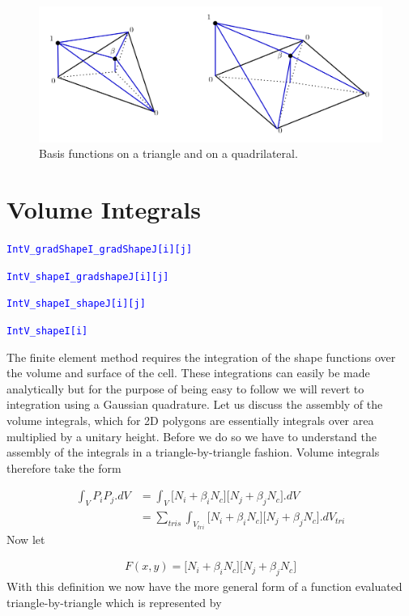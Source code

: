 \documentclass[11pt,letterpaper,titlepage]{article}
\newcommand{\beq}{\begin{equation*}
\begin{aligned}}
\newcommand{\eeq}{\end{aligned}
\end{equation*}}
\newcommand{\beqn}{\begin{equation}
	\begin{aligned}}
\newcommand{\eeqn}{\end{aligned}
	\end{equation}}
\newcommand{\xmltag}[1]{\textcolor{blue}{ \texttt{#1}} }
\begin{document}
\begin{figure}[H]
\centering
\includegraphics[width=1.0\linewidth]{Figures/TwoD_PolygonTriQuad}
\caption{Basis functions on a triangle and on a quadrilateral.}
\label{fig:twodpolygontriquad}
\end{figure}




\newpage 
{}
\section{Volume Integrals}
\xmltag{IntV\_gradShapeI\_gradShapeJ[i][j]}

\xmltag{IntV\_shapeI\_gradshapeJ[i][j]}

\xmltag{IntV\_shapeI\_shapeJ[i][j]}

\xmltag{IntV\_shapeI[i]}

\vspace{0.5cm}
The finite element method requires the integration of the shape functions over the volume and surface of the cell. These integrations can easily be made analytically but for the purpose of being easy to follow we will revert to integration using a Gaussian quadrature. Let us discuss the assembly of the volume integrals, which for 2D polygons are essentially integrals over area multiplied by a unitary height. Before we do so we have to understand the assembly of the integrals in a triangle-by-triangle fashion. Volume integrals therefore take the form

\beqn 
\int_V P_i P_j .dV &= 
\int_V \biggr[
N_i + \beta_i N_c
\biggr]
 \biggr[
N_j + \beta_j N_c
\biggr].dV \\
&=\sum_{tris} \int_{V_{tri}}  \biggr[
N_i + \beta_i N_c
\biggr]
 \biggr[
N_j + \beta_j N_c
\biggr].dV_{tri}
\eeqn
\newline
Now let 

\beq
F(x,y) =  \biggr[
N_i + \beta_i N_c
\biggr]
 \biggr[
N_j + \beta_j N_c
\biggr]
\eeq 
\newline 
With this definition we now have the more general form of a function evaluated triangle-by-triangle which is represented by
\end{document}
